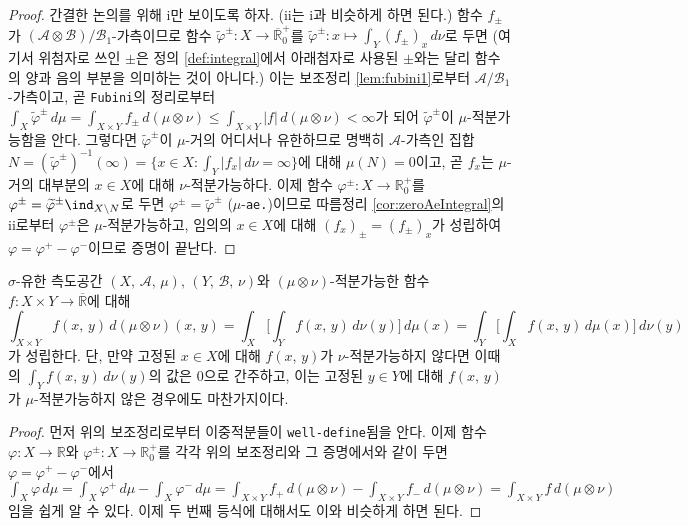 \begin{proof}
    간결한 논의를 위해 i만 보이도록 하자. (ii는 i과 비슷하게 하면 된다.) 함수 $f_\pm$가 $(\mathcal{A}\otimes\mathcal{B})/\mathcal{B}_1$-가측이므로 함수 $\widetilde{\varphi}^\pm:X\to\overline{\mathbb{R}}^+_0$를 $\widetilde{\varphi}^\pm:x\mapsto\int_Y(f_\pm)_x\,d\nu$로 두면 (여기서 위첨자로 쓰인 $\pm$은 정의 \ref{def:integral}에서 아래첨자로 사용된 $\pm$와는 달리 함수의 양과 음의 부분을 의미하는 것이 아니다.) 이는 보조정리 \ref{lem:fubini1}로부터 $\mathcal{A}/\mathcal{B}_1$-가측이고, 곧 \texttt{Fubini}의 정리로부터 $\int_X\widetilde{\varphi}^\pm\,d\mu=\int_{X\times Y}f_\pm\,d(\mu\otimes\nu)\leq\int_{X\times Y}|f|\,d(\mu\otimes\nu)<\infty$가 되어 $\widetilde{\varphi}^\pm$이 $\mu$-적분가능함을 안다. 그렇다면 $\widetilde{\varphi}^\pm$이 $\mu$-거의 어디서나 유한하므로 명백히 $\mathcal{A}$-가측인 집합 $N=(\widetilde{\varphi}^\pm)^{-1}(\infty)=\{x\in X:\int_Y|f_x|\,d\nu=\infty\}$에 대해 $\mu(N)=0$이고, 곧 $f_x$는 $\mu$-거의 대부분의 $x\in X$에 대해 $\nu$-적분가능하다. 이제 함수 $\varphi^\pm:X\to\mathbb{R}^+_0$를 $\varphi^\pm=\widetilde{\varphi}^\pm\ind_{X\setminus N}$로 두면 $\varphi^\pm=\widetilde{\varphi}^\pm$ ($\mu$-\texttt{ae.})이므로 따름정리 \ref{cor:zeroAeIntegral}의 ii로부터 $\varphi^\pm$은 $\mu$-적분가능하고, 임의의 $x\in X$에 대해 $(f_x)_\pm=(f_\pm)_x$가 성립하여 $\varphi=\varphi^+-\varphi^-$이므로 증명이 끝난다.
\end{proof}

\begin{theorem}[Fubini]
    $\sigma$-유한 측도공간 $(X,\,\mathcal{A},\,\mu),\,(Y,\,\mathcal{B},\,\nu)$와 $(\mu\otimes\nu)$-적분가능한 함수 $f:X\times Y\to\overline{\mathbb{R}}$에 대해
    \begin{equation*}
        \int_{X\times Y}f(x,\,y)\,d(\mu\otimes\nu)(x,\,y)=\int_X\bigg[\int_Yf(x,\,y)\,d\nu(y)\bigg]\,d\mu(x)=\int_Y\bigg[\int_Xf(x,\,y)\,d\mu(x)\bigg]\,d\nu(y)
    \end{equation*}
    가 성립한다. 단, 만약 고정된 $x\in X$에 대해 $f(x,\,y)$가 $\nu$-적분가능하지 않다면 이때의 $\int_Yf(x,\,y)\,d\nu(y)$의 값은 0으로 간주하고, 이는 고정된 $y\in Y$에 대해 $f(x,\,y)$가 $\mu$-적분가능하지 않은 경우에도 마찬가지이다.
\end{theorem}

\begin{proof}
    먼저 위의 보조정리로부터 이중적분들이 \texttt{well-define}됨을 안다. 이제 함수 $\varphi:X\to\mathbb{R}$와 $\varphi^\pm:X\to\mathbb{R}^+_0$를 각각 위의 보조정리와 그 증명에서와 같이 두면 $\varphi=\varphi^+-\varphi^-$에서 $\int_X\varphi\,d\mu=\int_X\varphi^+\,d\mu-\int_X\varphi^-\,d\mu=\int_{X\times Y}f_+\,d(\mu\otimes\nu)-\int_{X\times Y}f_-\,d(\mu\otimes\nu)=\int_{X\times Y}f\,d(\mu\otimes\nu)$임을 쉽게 알 수 있다. 이제 두 번째 등식에 대해서도 이와 비슷하게 하면 된다.
\end{proof}

